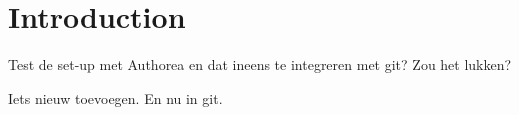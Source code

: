 \section{Introduction}
Test de set-up met Authorea en dat ineens te integreren met git? Zou het lukken?

Iets nieuw toevoegen. En nu in git.
